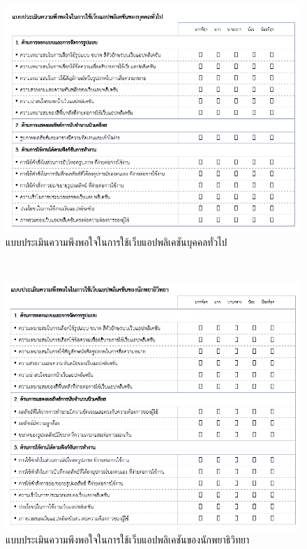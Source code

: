 \documentclass[12pt,oneside,openright,a4paper]{cpe-thai-project}
\begin{document}
 \\
\begin{figure}[!h]\centering
\includegraphics[width=15cm]{images/questionnairepeople.png}
\captionsetup{justification=centering}
\caption{แบบประเมินความพึงพอใจในการใช้เว็บแอปพลิเคชันบุคคลทั่วไป}\label{fig:homepageweb}
\end{figure}
\pagebreak

 \\
\begin{figure}[!h]\centering
\includegraphics[width=15cm]{images/questionnairepatho.png}
\captionsetup{justification=centering}
\caption{แบบประเมินความพึงพอใจในการใช้เว็บแอปพลิเคชันของนักพยาธิวิทยา}\label{fig:homepageweb}
\end{figure}
 
\end{document}
